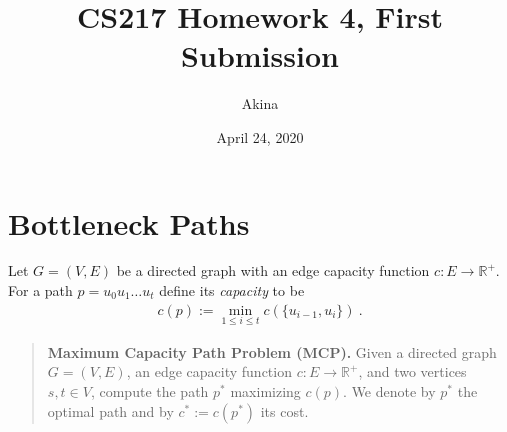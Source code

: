 \documentclass[11pt,a4paper,oneside]{article}
\newcommand{\R}{\mathbb{R}}
\renewcommand{\hwtitle} {CS217 Homework 4, First Submission}
\renewcommand{\hwauthor}{Akina}
\renewcommand{\hwdate}{April 24, 2020}
\begin{document}
\title{\hwtitle}
\author{\hwauthor}
\date{\hwdate}
\maketitle

\section*{Bottleneck Paths}

Let $G=(V,E)$ be a directed graph with an edge capacity function $c: E \rightarrow \R^+$. For a path
$p = u_0 u_1 \dots u_t$ define its {\em capacity} to be
\begin{align}
c(p) := \min_{1 \leq i \leq t} c( \{u_{i-1}, u_i\}) \ .
\end{align}

\begin{quotation}
	\textbf{Maximum Capacity Path Problem (MCP).} Given a directed graph $G = (V,E)$, an edge capacity function
	$c: E \rightarrow \R^+$, and two vertices $s, t \in V$, compute the path $p^*$ maximizing $c(p)$. We
	denote by $p^*$ the optimal path and by $c^* := c(p^*)$ its cost. 
\end{quotation}
\end{document}
